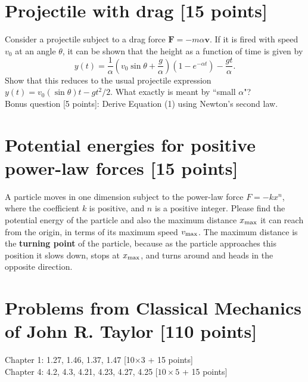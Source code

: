 \documentclass[11pt, a4paper]{article} %
\begin{document}
\section*{Projectile with drag [15 points]} 
Consider a projectile subject to a drag force $\textbf{F}=-m\alpha \textbf{v}$. If it is fired
with speed $v_0$ at an angle $\theta$, it can be shown that the height as a function of time is given by 
\begin{equation}
    y(t) = \frac{1}{\alpha} \left( v_0 \sin \theta + \frac{g}{\alpha} \right) \left( 1 - e^{-\alpha t} \right) - \frac{g t}{\alpha}.
\end{equation}
Show that this reduces to the usual projectile expression $y(t)=v_0(\sin\theta) t - gt^2/2$. What exactly is meant by ``small $\alpha$"? \\
Bonus question [5 points]: Derive Equation (1) using Newton's second law. 

\newpage 
\section*{Potential energies for positive power-law forces [15 points]} 
A particle moves in one dimension subject to the power-law force $F=-kx^n$, where the coefficient $k$ is positive, and $n$ is a positive integer. Please find the potential energy of the particle and also the maximum distance $x_{\rm max}$ it can reach from the origin, in terms of its maximum speed $v_{\rm max}$. The maximum distance is the \textbf{turning point} of the particle, because as the particle approaches this position it slows down, stops at $x_{\rm max}$, and turns around and heads in the opposite direction.

\newpage 
\section*{Problems from Classical Mechanics of John R. Taylor [110 points]} 
Chapter 1: 1.27, 1.46, 1.37, 1.47 [10$\times3$ + 15 points]\\
Chapter 4: 4.2, 4.3, 4.21, 4.23, 4.27, 4.25 [$10\times5$ + 15 points]\\
\end{document}

